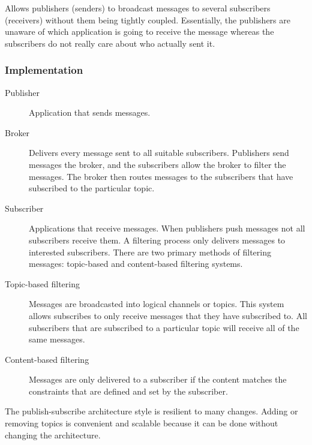 \begin{summary}
    Allows publishers (senders) to broadcast messages to several subscribers
    (receivers) without them being tightly coupled. Essentially, the publishers
    are unaware of which application is going to receive the message whereas
    the subscribers do not really care about who actually sent it.
\end{summary}


\subsubsection{Implementation}
\begin{description}
    \item[Publisher] Application that sends messages. 

    \item[Broker] Delivers every message sent to all suitable subscribers.
        Publishers send messages the broker, and the subscribers allow the
        broker to filter the messages. The broker then routes messages to the
        subscribers that have subscribed to the particular topic.

    \item[Subscriber] Applications that receive messages. When publishers push
        messages not all subscribers receive them. A filtering
        process only delivers messages to interested subscribers. There are two
        primary methods of filtering messages: topic-based and content-based
        filtering systems.

    \item[Topic-based filtering] Messages are broadcasted into logical channels
        or topics. This system allows subscribes to only receive messages that
        they have subscribed to. All subscribers that are subscribed to a
        particular topic will receive all of the same messages.

    \item[Content-based filtering] Messages are only delivered to a subscriber
        if the content matches the constraints that are defined and set by the
        subscriber. 
\end{description}

The publish-subscribe architecture style is resilient to many changes. Adding
or removing topics is convenient and scalable because it can be done without
changing the architecture.

